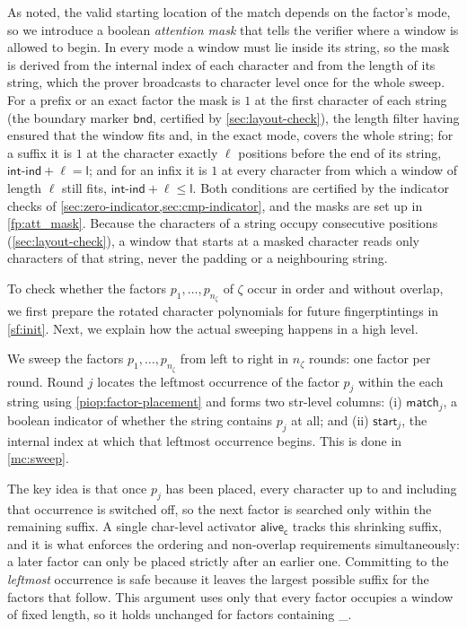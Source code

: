 As noted, the valid starting location of the match depends on the factor's mode, so we introduce a boolean \emph{attention mask} that tells the verifier where a window is allowed to begin. In every mode a window must lie inside its string, so the mask is derived from the internal index of each character and from the length of its string, which the prover broadcasts to character level once for the whole sweep. For a prefix or an exact factor the mask is $1$ at the first character of each string (the boundary marker $\mathsf{bnd}$, certified by \cref{sec:layout-check}), the length filter having ensured that the window fits and, in the exact mode, covers the whole string; for a suffix it is $1$ at the character exactly $\ell$ positions before the end of its string, $\mathsf{int\text{-}ind} + \ell = \mathsf{l}$; and for an infix it is $1$ at every character from which a window of length $\ell$ still fits, $\mathsf{int\text{-}ind} + \ell \le \mathsf{l}$. Both conditions are certified by the indicator checks of \cref{sec:zero-indicator,sec:cmp-indicator}, and the masks are set up in \cref{fp:att_mask}. Because the characters of a string occupy consecutive positions (\cref{sec:layout-check}), a window that starts at a masked character reads only characters of that string, never the padding or a neighbouring string.

 To check whether the factors $p_1,\dots,p_{n_\zeta}$ of $\zeta$ occur in order and without overlap, we first prepare the rotated character polynomials for future fingerptintings in \cref{sf:init}. Next, we explain how the actual sweeping happens in a high level.

 We sweep the factors $p_1,\dots,p_{n_\zeta}$ from left to right in $n_\zeta$ rounds: one factor per round. Round $j$ locates the leftmost occurrence of the factor $p_j$ within the each string using \cref{piop:factor-placement} and forms two str-level columns: (i) $\mathsf{match}_j$, a boolean indicator of whether the string contains $p_j$ at all; and (ii) $\mathsf{start}_j$, the internal index at which that leftmost occurrence begins. This is done in \cref{mc:sweep}.

The key idea is that once $p_j$ has been placed, every character up to and including that occurrence is switched off, so the next factor is searched only within the remaining suffix. A single char-level activator $\mathsf{alive_c}$ tracks this shrinking suffix, and it is what enforces the ordering and non-overlap requirements simultaneously: a later factor can only be placed strictly after an earlier one. Committing to the \emph{leftmost} occurrence is safe because it leaves the largest possible suffix for the factors that follow. This argument uses only that every factor occupies a window of fixed length, so it holds unchanged for factors containing \_.


